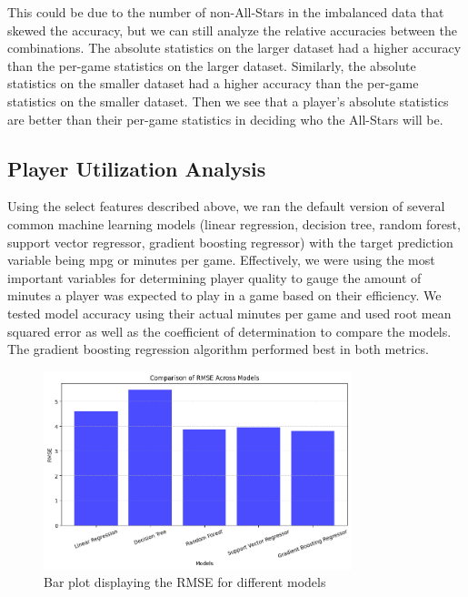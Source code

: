 \documentclass[12pt]{article}
\begin{document}
This could be due to the number of non-All-Stars in the imbalanced data that skewed the accuracy, but we can still analyze the relative accuracies between the combinations. The absolute statistics on the larger dataset had a higher accuracy than the per-game statistics on the larger dataset. Similarly, the absolute statistics on the smaller dataset had a higher accuracy than the per-game statistics on the smaller dataset. Then we see that a player’s absolute statistics are better than their per-game statistics in deciding who the All-Stars will be.

\subsection{Player Utilization Analysis}
Using the select features described above, we ran the default version of several common machine learning models (linear regression, decision tree, random forest, support vector regressor, gradient boosting regressor) with the target prediction variable being mpg or minutes per game. Effectively, we were using the most important variables for determining player quality to gauge  the amount of minutes a player was expected to play in a game based on their efficiency. We tested model accuracy using their actual minutes per game and used root mean squared error as well as the coefficient of determination to compare the models. The gradient boosting regression algorithm performed best in both metrics. 

\begin{figure}[H]
    \centering
    \includegraphics[width=0.8\textwidth]{MM_EP_RMSE.png}
    \caption{Bar plot displaying the RMSE for different models}
    \label{fig:team_utilization}
\end{figure}
\end{document}
